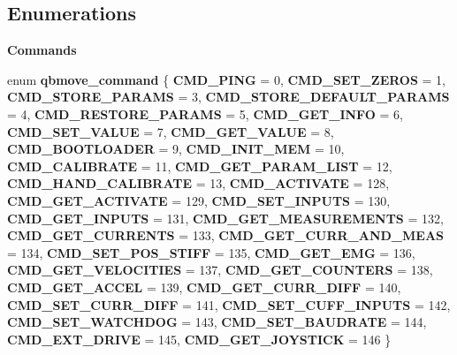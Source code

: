\subsection*{Enumerations}
\begin{Indent}\textbf{ Commands}\par
\begin{DoxyCompactItemize}
\item 
enum \textbf{ qbmove\+\_\+command} \{ \newline
\textbf{ C\+M\+D\+\_\+\+P\+I\+NG} = 0, 
\textbf{ C\+M\+D\+\_\+\+S\+E\+T\+\_\+\+Z\+E\+R\+OS} = 1, 
\textbf{ C\+M\+D\+\_\+\+S\+T\+O\+R\+E\+\_\+\+P\+A\+R\+A\+MS} = 3, 
\textbf{ C\+M\+D\+\_\+\+S\+T\+O\+R\+E\+\_\+\+D\+E\+F\+A\+U\+L\+T\+\_\+\+P\+A\+R\+A\+MS} = 4, 
\newline
\textbf{ C\+M\+D\+\_\+\+R\+E\+S\+T\+O\+R\+E\+\_\+\+P\+A\+R\+A\+MS} = 5, 
\textbf{ C\+M\+D\+\_\+\+G\+E\+T\+\_\+\+I\+N\+FO} = 6, 
\textbf{ C\+M\+D\+\_\+\+S\+E\+T\+\_\+\+V\+A\+L\+UE} = 7, 
\textbf{ C\+M\+D\+\_\+\+G\+E\+T\+\_\+\+V\+A\+L\+UE} = 8, 
\newline
\textbf{ C\+M\+D\+\_\+\+B\+O\+O\+T\+L\+O\+A\+D\+ER} = 9, 
\textbf{ C\+M\+D\+\_\+\+I\+N\+I\+T\+\_\+\+M\+EM} = 10, 
\textbf{ C\+M\+D\+\_\+\+C\+A\+L\+I\+B\+R\+A\+TE} = 11, 
\textbf{ C\+M\+D\+\_\+\+G\+E\+T\+\_\+\+P\+A\+R\+A\+M\+\_\+\+L\+I\+ST} = 12, 
\newline
\textbf{ C\+M\+D\+\_\+\+H\+A\+N\+D\+\_\+\+C\+A\+L\+I\+B\+R\+A\+TE} = 13, 
\textbf{ C\+M\+D\+\_\+\+A\+C\+T\+I\+V\+A\+TE} = 128, 
\textbf{ C\+M\+D\+\_\+\+G\+E\+T\+\_\+\+A\+C\+T\+I\+V\+A\+TE} = 129, 
\textbf{ C\+M\+D\+\_\+\+S\+E\+T\+\_\+\+I\+N\+P\+U\+TS} = 130, 
\newline
\textbf{ C\+M\+D\+\_\+\+G\+E\+T\+\_\+\+I\+N\+P\+U\+TS} = 131, 
\textbf{ C\+M\+D\+\_\+\+G\+E\+T\+\_\+\+M\+E\+A\+S\+U\+R\+E\+M\+E\+N\+TS} = 132, 
\textbf{ C\+M\+D\+\_\+\+G\+E\+T\+\_\+\+C\+U\+R\+R\+E\+N\+TS} = 133, 
\textbf{ C\+M\+D\+\_\+\+G\+E\+T\+\_\+\+C\+U\+R\+R\+\_\+\+A\+N\+D\+\_\+\+M\+E\+AS} = 134, 
\newline
\textbf{ C\+M\+D\+\_\+\+S\+E\+T\+\_\+\+P\+O\+S\+\_\+\+S\+T\+I\+FF} = 135, 
\textbf{ C\+M\+D\+\_\+\+G\+E\+T\+\_\+\+E\+MG} = 136, 
\textbf{ C\+M\+D\+\_\+\+G\+E\+T\+\_\+\+V\+E\+L\+O\+C\+I\+T\+I\+ES} = 137, 
\textbf{ C\+M\+D\+\_\+\+G\+E\+T\+\_\+\+C\+O\+U\+N\+T\+E\+RS} = 138, 
\newline
\textbf{ C\+M\+D\+\_\+\+G\+E\+T\+\_\+\+A\+C\+C\+EL} = 139, 
\textbf{ C\+M\+D\+\_\+\+G\+E\+T\+\_\+\+C\+U\+R\+R\+\_\+\+D\+I\+FF} = 140, 
\textbf{ C\+M\+D\+\_\+\+S\+E\+T\+\_\+\+C\+U\+R\+R\+\_\+\+D\+I\+FF} = 141, 
\textbf{ C\+M\+D\+\_\+\+S\+E\+T\+\_\+\+C\+U\+F\+F\+\_\+\+I\+N\+P\+U\+TS} = 142, 
\newline
\textbf{ C\+M\+D\+\_\+\+S\+E\+T\+\_\+\+W\+A\+T\+C\+H\+D\+OG} = 143, 
\textbf{ C\+M\+D\+\_\+\+S\+E\+T\+\_\+\+B\+A\+U\+D\+R\+A\+TE} = 144, 
\textbf{ C\+M\+D\+\_\+\+E\+X\+T\+\_\+\+D\+R\+I\+VE} = 145, 
\textbf{ C\+M\+D\+\_\+\+G\+E\+T\+\_\+\+J\+O\+Y\+S\+T\+I\+CK} = 146
 \}
\end{DoxyCompactItemize}
\end{Indent}
